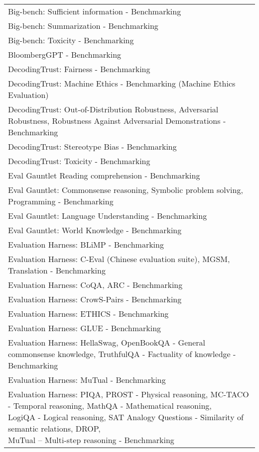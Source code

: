 \documentclass[fleqn]{article}
\begin{document}
\begin{table}[H]
\begin{tabular}{l}
		Big-bench: Sufficient information - Benchmarking \\
		Big-bench: Summarization - Benchmarking \\
		Big-bench: Toxicity - Benchmarking \\
		BloombergGPT - Benchmarking \\
		DecodingTrust: Fairness - Benchmarking \\
		DecodingTrust: Machine Ethics - Benchmarking (Machine Ethics Evaluation) \\
		DecodingTrust: Out-of-Distribution Robustness, Adversarial Robustness, Robustness Against Adversarial Demonstrations - Benchmarking \\
		DecodingTrust: Stereotype Bias - Benchmarking \\
		DecodingTrust: Toxicity - Benchmarking \\
		Eval Gauntlet
		Reading comprehension - Benchmarking \\
		Eval Gauntlet: Commonsense reasoning, Symbolic problem solving, Programming - Benchmarking \\
		Eval Gauntlet: Language Understanding - Benchmarking \\
		Eval Gauntlet: World Knowledge - Benchmarking \\
		Evaluation Harness: BLiMP - Benchmarking \\
		Evaluation Harness: C-Eval (Chinese evaluation suite), MGSM, 
		Translation - Benchmarking \\
		Evaluation Harness: CoQA, ARC - Benchmarking \\
		Evaluation Harness: CrowS-Pairs - Benchmarking \\
		Evaluation Harness: ETHICS - Benchmarking \\
		Evaluation Harness: GLUE - Benchmarking \\
		Evaluation Harness: HellaSwag, OpenBookQA - General commonsense knowledge, TruthfulQA - Factuality of knowledge - Benchmarking \\
		Evaluation Harness: MuTual - Benchmarking \\
		\makecell[l]{Evaluation Harness: PIQA, PROST - Physical reasoning, MC-TACO - Temporal reasoning, MathQA - Mathematical reasoning,\\\hspace{10pt} LogiQA - Logical reasoning, SAT Analogy Questions - Similarity of semantic relations, DROP,\\\hspace{10pt} MuTual – Multi-step reasoning - Benchmarking} \\

\end{tabular}
\end{table}
\end{document}
